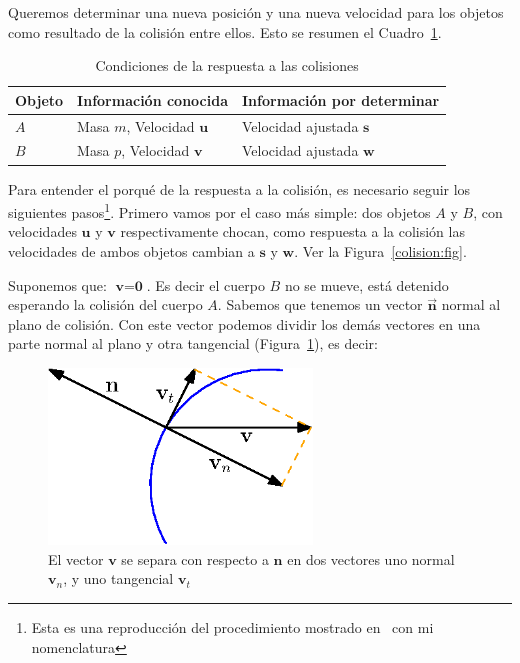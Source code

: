 Queremos determinar una nueva posición y una nueva velocidad para los objetos como resultado de la colisión entre ellos.
Esto se resumen el Cuadro~\ref{condiciones:Colision}.

\begin{table}
\begin{center}
\begin{tabular} {@{}lll@{}}
\toprule
Objeto & Información conocida & Información por determinar \\
\midrule
$A$ & Masa $m$, Velocidad $\textbf{u}$ & Velocidad ajustada $\textbf{s}$ \\
$B$ & Masa $p$, Velocidad $\textbf{v}$ & Velocidad ajustada $\textbf{w}$ \\
\bottomrule
\end{tabular}
\end{center}
\caption{Condiciones de la respuesta a las colisiones}
\label{condiciones:Colision}
\end{table}

Para entender el porqué de la respuesta a la colisión, es necesario seguir los siguientes pasos\footnote{Esta es una reproducción del procedimiento mostrado en~\cite{FisicaMatematicasVideojuegos} con mi nomenclatura}.
Primero vamos por el caso más simple: dos objetos $A$ y $B$, con velocidades $\textbf{u}$ y $\textbf{v}$ respectivamente chocan, como respuesta a la colisión las velocidades de ambos objetos cambian a $\textbf{s}$ y $\textbf{w}$.
Ver la Figura~\ref{colision:fig}.

Suponemos que: $\textbf{v} = \textbf{0}$. Es decir el cuerpo $B$ no se mueve, está detenido esperando la colisión del cuerpo $A$. Sabemos que tenemos un vector $\vec{\textbf{n}}$ normal al plano de colisión.
Con este vector podemos dividir los demás vectores en una parte normal al plano y otra tangencial  (Figura~\ref{comVec:fig}), es decir:

\begin{figure}
 \centering
 \includegraphics[width=7cm]{Img/02/vector_componente}
 \caption[Separar componente tangencial y normal de un vector]{ 
 El vector $\textbf{v}$ se separa con respecto a $\textbf{n}$ en dos vectores uno normal $\textbf{v}_n$, y uno tangencial $\textbf{v}_t$ 
 } \label{comVec:fig}
\end{figure}

